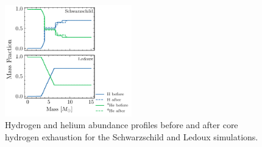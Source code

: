\documentclass[twocolumn,fontsize=11pt]{scrartcl}
\begin{document}
\begin{figure}
    \centering
    \includegraphics[width=0.49\textwidth]{q34hydrogen_exhausted.pdf}
    \caption{Hydrogen and helium abundance profiles before and after core hydrogen exhaustion for the Schwarzschild and Ledoux simulations.}
    \label{fig:q34hydrogen_exhausted}   
\end{figure}

\printbibliography
\end{document}
